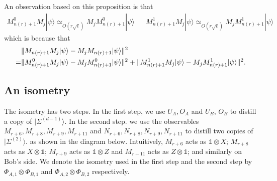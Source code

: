 \documentclass[11pt,letterpaper]{article}
\newcommand{\ket}[1]{|#1\rangle}
\newcommand{\x}{\otimes}
\DeclarePairedDelimiter{\norm}{\lVert}{\rVert}
\newcommand{\1}{\mathbb{1}}
\newcommand{\EPR}[1]{\Sigma^{(#1)}}
\newcommand{\nr}{n(r)}
\newcommand{\se}{\sqrt{\epsilon}}
\newcommand{\appd}[1]{\simeq_{#1}}
\theoremstyle{definition}
\begin{document}
An observation based on this proposition is that 
\begin{align}
	M_{\nr+1}^0 M_j \ket{\psi} \appd{O(r\se)} M_j M_{\nr+1}^0 \ket{\psi} &&
	M_{\nr+1}^1 M_j \ket{\psi} \appd{O(r\se)} M_j M_{\nr+1}^1 \ket{\psi} &&
\end{align}
which is because that 
\begin{align}
	&\norm{M_{\nr+1} M_j \ket{\psi} - M_j M_{\nr+1} \ket{\psi}}^2 \\
	=& \norm{M_{\nr+1}^0 M_j  \ket{\psi} - M_j M_{\nr+1}^0 \ket{\psi}}^2
	+ \norm{M_{\nr+1}^1 M_j  \ket{\psi} - M_j M_{\nr+1}^1\ket{\psi}}^2.
\end{align}

\subsection{An isometry}
\label{sec:isometry}
The isometry has two steps. In the first step, 
we use $U_A, O_A$ and $U_B$, $O_B$ to distill a copy of $\ket{\EPR{d-1}}$.
In the second step. we use the observables $M_{r+6},M_{r+8}, M_{r+9}, M_{r+11}$ and 
$N_{r+6}, N_{r+8}, N_{r+9}, N_{r+11}$ to distill two copies of $\ket{\EPR{2}}$.
as shown in the diagram below. Intuitively, $M_{r+6}$ acts as $\1 \x X$; $M_{r+8}$ acts as $X \x \1$;
$M_{r+9}$ acts as $\1 \x Z$ and $M_{r+11}$ acts as $Z \x \1$; and similarly on Bob's side.
We denote the isometry used in the first step and the second step by $\Phi_{A,1} \x \Phi_{B,1}$ and 
$\Phi_{A,2} \x \Phi_{B,2}$ respectively.
\end{document}
